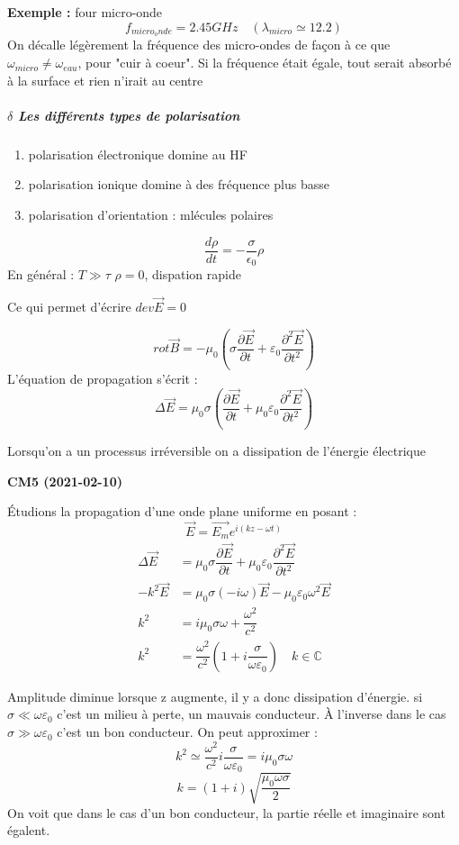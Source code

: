 \documentclass[12pt,a4paper]{report}
\newcommand{\ens}[1]{\mathbb{#1}}
\begin{document}
\textbf{Exemple :} four micro-onde
\[
	f_{micro_onde} = 2.45GHz \quad	(\lambda_{micro} \simeq 12.2)
\]
On décalle légèrement la fréquence des micro-ondes de façon à ce que \(\omega_{micro} \neq \omega_{eau}\), pour "cuir à coeur". Si la fréquence était égale, tout serait absorbé à la surface et rien n'irait au centre

\subparagraph{$\delta$ Les différents types de polarisation}

\begin{enumerate}
	\item polarisation électronique domine au HF
	\item polarisation ionique domine à des fréquence plus basse
	\item polarisation d'orientation : mlécules polaires
\end{enumerate}

\[
	\dfrac{d\rho}{dt} = -\dfrac{\sigma}{\epsilon_0}\rho
\]
En général : \(T \gg \tau\)
\(\rho = 0\), dispation rapide

Ce qui permet d'écrire \(dev\vec{E} = 0\)

\[
	rot \vec{B} = -\mu_0 \left( \sigma \dfrac{\partial \vec{E}}{\partial t} + \varepsilon_0 \dfrac{\partial^2 \vec{E}}{\partial t^2}\right)
\]
L'équation de propagation s'écrit :
\[
	\Delta \vec{E} = \mu_0 \sigma \left( \dfrac{\partial \vec{E}}{\partial t} + \mu_0\varepsilon_0 \dfrac{\partial^2 \vec{E}}{\partial t^2}\right)
\]

Lorsqu'on a un processus irréversible on a dissipation de l'énergie électrique

\begin{center}
\textbf{CM5 (2021-02-10)}
\end{center}

Étudions la propagation d'une onde plane uniforme en posant :
\[
	\vec{E} = \vec{E_m} e^{i(kz-\omega t)}
\]
\begin{align*}
	\Delta \vec{E} &= \mu_0 \sigma  \dfrac{\partial \vec{E}}{\partial t} + \mu_0 \varepsilon_0 \dfrac{\partial^2 \vec{E}}{\partial t^2}\\
	-k^2 \vec{E} &= \mu_0 \sigma (-i\omega) \vec{E} - \mu_0 \varepsilon_0 \omega^2 \vec{E}\\
	k^2 &= i\mu_0 \sigma \omega + \dfrac{\omega^2}{c^2}\\
	k^2 &= \dfrac{\omega^2}{c^2} \left( 1 + i\dfrac{\sigma}{\omega \varepsilon_0}\right) \quad
	k \in \ens{C}
\end{align*}

Amplitude diminue lorsque z augmente, il y a donc dissipation d'énergie. si \(\sigma \ll \omega \varepsilon_0\) c'est un milieu à perte, un mauvais conducteur.
À l'inverse dans le cas \(\sigma \gg \omega \varepsilon_0\) c'est un bon conducteur.
On peut approximer :
\[
	k^2 \simeq \dfrac{\omega^2}{c^2} i\dfrac{\sigma}{\omega \varepsilon_0} = i\mu_0 \sigma \omega
\]
\[
	k = (1+i) \sqrt{\dfrac{\mu_0 \omega \sigma}{2}}
\]
On voit que dans le cas d'un bon conducteur, la partie réelle et imaginaire sont égalent.
\end{document}
